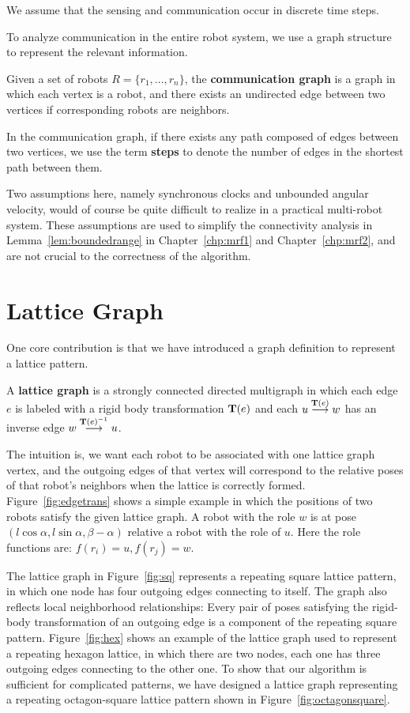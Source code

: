 We assume that the sensing and communication occur in discrete time steps. 

To analyze communication in the entire robot system, we use a graph structure to represent the relevant information.

\begin{defn}
  Given a set of robots $R =\{r_1, ..., r_n\}$, the \textbf{communication
  graph} is a graph in which each vertex is a robot, and there exists an
  undirected edge between two vertices if corresponding robots are neighbors.
\end{defn}

In the communication graph, if there exists any path composed of edges between two vertices, we use the term
\textbf{steps} to denote the number of edges in the shortest path between
them.

Two assumptions here, namely synchronous clocks and unbounded angular velocity, 
would of course be quite difficult to realize in a practical multi-robot system. 
%
These assumptions are used to simplify the connectivity analysis in Lemma~\ref{lem:boundedrange} in Chapter~\ref{chp:mrf1} and Chapter~\ref{chp:mrf2}, 
and are not crucial to the correctness of the algorithm.


\section{Lattice Graph}
\label{sec:latt-graph}
One core contribution is that we have introduced a graph definition to represent a lattice pattern.
%
\begin{defn}
  \label{def:latticegraph}
  A \textbf{lattice graph} is a strongly connected directed multigraph in which
  each edge $e$ is labeled with a rigid body transformation $\mathbf{T}(e)$ and each
  ${u}\overset{\mathbf{T}(e)}{\longrightarrow}{w}$ has an inverse edge ${w}\overset{\mathbf{T}(e)^{-1}}{\longrightarrow}{u}$.
\end{defn}

The intuition is, we want each robot to be associated with one lattice graph vertex, 
and the outgoing edges of that vertex will correspond to the relative poses of that robot's neighbors when the lattice is correctly formed.
%
Figure~\ref{fig:edgetrans} shows a simple example in which the positions of two
robots satisfy the given lattice graph. 
A robot with the role $w$ is
at pose $(l\cos{\alpha}, l\sin{\alpha}, \beta-\alpha)$ relative a robot with the role of
$u$. Here the role functions are: $f(r_i) = u, f(r_j) = w$.


The lattice graph in Figure~\ref{fig:sq} represents a repeating square lattice pattern, 
in which one node has four outgoing edges connecting to itself. 
%
The graph also reflects local neighborhood relationships:
%
Every pair of poses satisfying the rigid-body transformation of an outgoing edge is a component of the repeating square pattern.
%
Figure~\ref{fig:hex} shows an example of the lattice graph used to represent a
repeating hexagon lattice, in which there are two nodes, each one has three outgoing edges connecting to the other one. 
%
To show that our algorithm is sufficient for complicated patterns, 
we have designed a lattice graph representing a repeating octagon-square lattice pattern shown in Figure~\ref{fig:octagonsquare}.
%

